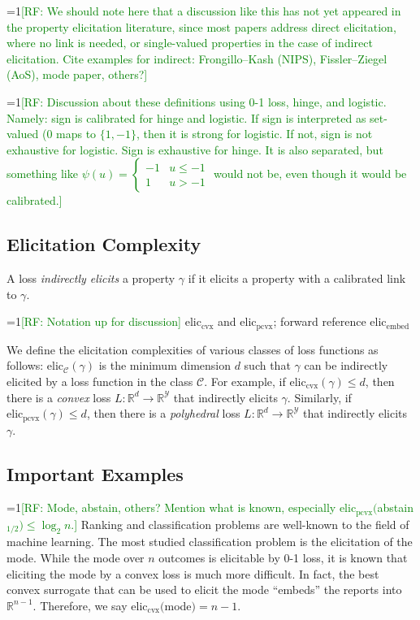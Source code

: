 \documentclass[anon,12pt]{colt2019}
\newcommand{\Comments}{1}
\newcommand{\mynote}[2]{\ifnum\Comments=1\textcolor{#1}{#2}\fi}
\newcommand{\raf}[1]{\mynote{green}{[RF: #1]}}
\newcommand{\reals}{\mathbb{R}}
\newcommand{\eliccvx}{\mathrm{elic}_\mathrm{cvx}}
\newcommand{\elicpoly}{\mathrm{elic}_\mathrm{pcvx}}
\newcommand{\elicembed}{\mathrm{elic}_\mathrm{embed}}
\newcommand{\C}{\mathcal{C}}
\newcommand{\Y}{\mathcal{Y}}
\begin{document}
\raf{We should note here that a discussion like this has not yet appeared in the property elicitation literature, since most papers address direct elicitation, where no link is needed, or single-valued properties in the case of indirect elicitation.  Cite examples for indirect: Frongillo--Kash (NIPS), Fissler--Ziegel (AoS), mode paper, others?}

\raf{Discussion about these definitions using 0-1 loss, hinge, and logistic.  Namely: sign is calibrated for hinge and logistic.  If sign is interpreted as set-valued (0 maps to $\{1,-1\}$, then it is strong for logistic.  If not, sign is not exhaustive for logistic.  Sign is exhaustive for hinge.  It is also separated, but something like $\psi(u) =
  \begin{cases}
    -1 & u \leq -1\\
    1 & u > -1
  \end{cases}$
  would not be, even though it would be calibrated.}


\subsection{Elicitation Complexity}

\begin{definition}
  A loss \emph{indirectly elicits} a property $\gamma$ if it elicits a property with a calibrated link to $\gamma$.
\end{definition}

\raf{Notation up for discussion}
$\eliccvx$ and $\elicpoly$; forward reference $\elicembed$

We define the elicitation complexities of various classes of loss functions as follows: elic$_\C(\gamma)$ is the minimum dimension $d$ such that $\gamma$ can be indirectly elicited by a loss function in the class $\C$.
For example, if $\eliccvx(\gamma) \leq d$, then there is a \emph{convex} loss $L:\reals^d \to \reals^\Y$ that indirectly elicits $\gamma$.
Similarly, if $\elicpoly(\gamma) \leq d$, then there is a \emph{polyhedral} loss $L:\reals^d \to \reals^\Y$ that indirectly elicits $\gamma$.

\subsection{Important Examples}
\raf{Mode, abstain, others?  Mention what is known, especially $\elicpoly($abstain$_{1/2}) \leq \log_2 n$.}
Ranking and classification problems are well-known to the field of machine learning.
The most studied classification problem is the elicitation of the mode.
While the mode over $n$ outcomes is elicitable by 0-1 loss, it is known that eliciting the mode by a convex loss is much more difficult.
In fact, the best convex surrogate that can be used to elicit the mode ``embeds'' the reports into $\reals^{n-1}$.
Therefore, we say $\eliccvx($mode$) = n-1$.
\end{document}
